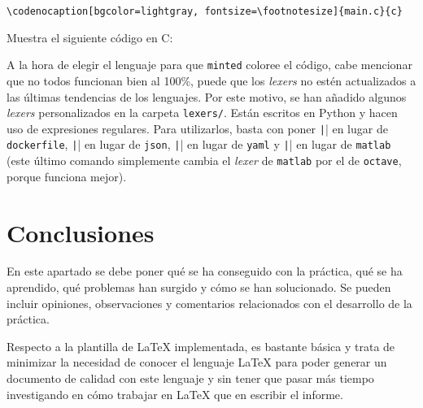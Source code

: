 \documentclass[../main.tex]{subfile}
\begin{document}
    \begin{verbatim}
\codenocaption[bgcolor=lightgray, fontsize=\footnotesize]{main.c}{c}
    \end{verbatim}

    Muestra el siguiente código en C:


    A la hora de elegir el lenguaje para que \texttt{minted} coloree el código, cabe mencionar que no todos funcionan bien al 100\%, puede que los \textit{lexers} no estén actualizados a las últimas tendencias de los lenguajes. Por este motivo, se han añadido algunos \textit{lexers} personalizados en la carpeta \texttt{lexers/}. Están escritos en Python y hacen uso de expresiones regulares. Para utilizarlos, basta con poner \texttt|\dockerfile| en lugar de \texttt{dockerfile}, \texttt|\json| en lugar de \texttt{json}, \texttt|\yaml| en lugar de \texttt{yaml} y \texttt|\matlab| en lugar de \texttt{matlab} (este último comando simplemente cambia el \textit{lexer} de \texttt{matlab} por el de \texttt{octave}, porque funciona mejor).

  \section{Conclusiones}

    En este apartado se debe poner qué se ha conseguido con la práctica, qué se ha aprendido, qué problemas han surgido y cómo se han solucionado. Se pueden incluir opiniones, observaciones y comentarios relacionados con el desarrollo de la práctica.

    Respecto a la plantilla de LaTeX implementada, es bastante básica y trata de minimizar la necesidad de conocer el lenguaje LaTeX para poder generar un documento de calidad con este lenguaje y sin tener que pasar más tiempo investigando en cómo trabajar en LaTeX que en escribir el informe.
\end{document}
